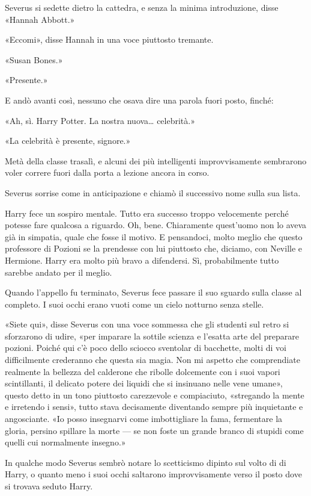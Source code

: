 Severus si sedette dietro la cattedra, e senza la minima introduzione, disse «Hannah Abbott.»

«Eccomi», disse Hannah in una voce piuttosto tremante.

«Susan Bones.»

«Presente.»

E andò avanti così, nessuno che osava dire una parola fuori posto, finché:

«Ah, sì. Harry Potter. La nostra nuova… celebrità.»

«La celebrità è presente, signore.»

Metà della classe trasalì, e alcuni dei più intelligenti improvvisamente sembrarono voler correre fuori dalla porta a lezione ancora in corso.

Severus sorrise come in anticipazione e chiamò il successivo nome sulla sua lista.

Harry fece un sospiro mentale. Tutto era successo troppo velocemente perché potesse fare qualcosa a riguardo. Oh, bene. Chiaramente quest’uomo non lo aveva già in simpatia, quale che fosse il motivo. E pensandoci, molto meglio che questo professore di Pozioni se la prendesse con lui piuttosto che, diciamo, con Neville e Hermione. Harry era molto più bravo a difendersi. Sì, probabilmente tutto sarebbe andato per il meglio.

Quando l’appello fu terminato, Severus fece passare il suo sguardo sulla classe al completo. I suoi occhi erano vuoti come un cielo notturno senza stelle.

«Siete qui», disse Severus con una voce sommessa che gli studenti sul retro si sforzarono di udire, «per imparare la sottile scienza e l’esatta arte del preparare pozioni. Poiché qui c’è poco dello sciocco sventolar di bacchette, molti di voi difficilmente crederanno che questa sia magia. Non mi aspetto che comprendiate realmente la bellezza del calderone che ribolle dolcemente con i suoi vapori scintillanti, il delicato potere dei liquidi che si insinuano nelle vene umane», questo detto in un tono piuttosto carezzevole e compiaciuto, «stregando la mente e irretendo i sensi», tutto stava decisamente diventando sempre più inquietante e angosciante. «Io posso insegnarvi come imbottigliare la fama, fermentare la gloria, persino spillare la morte — se non foste un grande branco di stupidi come quelli cui normalmente insegno.»

In qualche modo Severus sembrò notare lo scetticismo dipinto sul volto di di Harry, o quanto meno i suoi occhi saltarono improvvisamente verso il posto dove si trovava seduto Harry.

